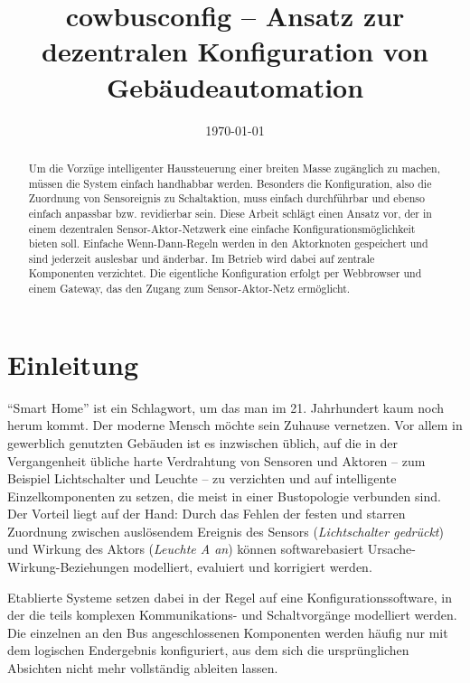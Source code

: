 \documentclass[conference]{IEEEtran}
\begin{document}
\title{cowbusconfig -- Ansatz zur dezentralen Konfiguration von Gebäudeautomation}
\author{
\and
{} 
}
\date{\today}



\maketitle

\begin{abstract}
    Um die Vorzüge intelligenter Haussteuerung einer breiten Masse zugänglich
    zu machen, müssen die System einfach handhabbar werden.
    Besonders die Konfiguration, also die Zuordnung von Sensoreignis zu
    Schaltaktion, muss einfach durchführbar und ebenso einfach anpassbar
    bzw. revidierbar sein. Diese Arbeit schlägt einen Ansatz vor,
    der in einem dezentralen Sensor-Aktor-Netzwerk eine einfache
    Konfigurationsmöglichkeit bieten soll.
    Einfache Wenn-Dann-Regeln werden in den Aktorknoten gespeichert und
    sind jederzeit auslesbar und änderbar.
    Im Betrieb wird dabei auf zentrale Komponenten verzichtet.
    Die eigentliche Konfiguration erfolgt per Webbrowser und einem Gateway,
    das den Zugang zum Sensor-Aktor-Netz ermöglicht.
\end{abstract}

\section{Einleitung}
    \enquote{Smart Home} ist ein Schlagwort, um das man im 21. Jahrhundert
    kaum noch herum kommt. Der moderne Mensch möchte sein Zuhause vernetzen.
    Vor allem in gewerblich genutzten Gebäuden ist es inzwischen üblich,
    auf die in der Vergangenheit übliche harte Verdrahtung von Sensoren und
    Aktoren -- zum Beispiel Lichtschalter und Leuchte -- zu verzichten
    und auf intelligente Einzelkomponenten zu setzen, die meist in einer
    Bustopologie verbunden sind. Der Vorteil liegt auf der Hand:
    Durch das Fehlen der festen und starren Zuordnung zwischen auslösendem
    Ereignis des Sensors (\emph{Lichtschalter gedrückt})
    und Wirkung des Aktors (\emph{Leuchte A an})
    können softwarebasiert Ursache-Wirkung-Beziehungen modelliert, evaluiert
    und korrigiert werden.

    Etablierte Systeme setzen dabei in der Regel auf eine
    Konfigurationssoftware, in der die teils komplexen Kommunikations- und
    Schaltvorgänge modelliert werden.
    Die einzelnen an den Bus angeschlossenen Komponenten werden häufig nur
    mit dem logischen Endergebnis konfiguriert,
    aus dem sich die ursprünglichen Absichten nicht mehr vollständig ableiten
    lassen.
\end{document}
